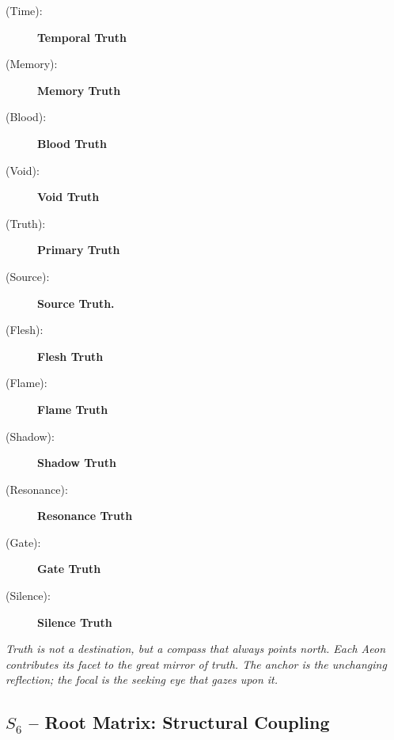 \begin{description}
    \item[(Time):] \fetuborha {} \textbf{Temporal Truth} \\
    \item[(Memory):] \kalnar {} \textbf{Memory Truth} \\
    \item[(Blood):] \babdhsor {} \textbf{Blood Truth} \\
    \item[(Void):] \ahnohl {} \textbf{Void Truth} \\
    \item[(Truth):] \velful {} \textbf{Primary Truth} \\
    \item[(Source):] \sorkos {} \textbf{Source Truth.} \\
    \item[(Flesh):] \kothinn {} \textbf{Flesh Truth} \\
    \item[(Flame):] \drehhol {} \textbf{Flame Truth} \\
    \item[(Shadow):] \rheafelh {} \textbf{Shadow Truth} \\
    \item[(Resonance):] \zhekpel {} \textbf{Resonance Truth} \\
    \item[(Gate):] \shavskyh {} \textbf{Gate Truth} \\
    \item[(Silence):] \trigmeru {} \textbf{Silence Truth} \\
\end{description}

\textit{Truth is not a destination, but a compass that always points north. Each Aeon contributes its facet to the great mirror of truth. The anchor is the unchanging reflection; the focal is the seeking eye that gazes upon it.}

\subsection{$S_{6}$ -- Root Matrix: Structural Coupling}\label{sec:19.0.6}

